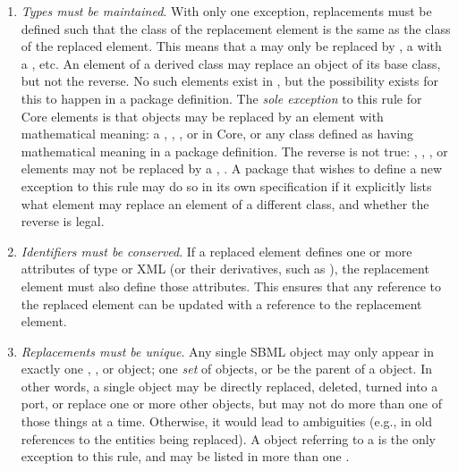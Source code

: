 \begin{enumerate}

\item \emph{Types must be maintained}.  With only one exception, replacements must be defined such that the class of the replacement element is the same as the class of the replaced element.  This means that a \Species may only be replaced by \Species, a \Reaction with a \Reaction, etc.  An element of a derived class may replace an object of its base class, but not the reverse.  No such elements exist in \sbmlthreecore, but the possibility exists for this to happen in a package definition.  The \emph{sole exception} to this rule for Core elements is that \Parameter {} objects may be replaced by an element with mathematical meaning: a \Compartment, \Reaction, \Species, or \SpeciesReference in Core, or any class defined as having mathematical meaning in a package definition.    The reverse is not true: \Compartment, \Reaction, \Species, or \SpeciesReference elements may not be replaced by a \Parameter, .  A package that wishes to define a new exception to this rule may do so in its own specification if it explicitly lists what element may replace an element of a different class, and whether the reverse is legal.

\item \emph{Identifiers must be conserved}.  If a replaced element defines one or more attributes of type  or XML  (or their derivatives, such as ), the replacement element must also define those attributes.  This ensures that any reference to the replaced element can be updated with a reference to the replacement element.

\item \emph{Replacements must be unique}.  Any single SBML object may only appear in exactly one \ReplacedElement,  \Port, or \Deletion object; one \emph{set} of \ReplacedBy objects, or be the parent of a \ReplacedBy object.  In other words, a single object may be directly replaced, deleted, turned into a port, or replace one or more other objects, but may not do more than one of those things at a time.  Otherwise, it would lead to ambiguities (e.g., in old references to the entities being replaced). A \ReplacedElement object referring to a \Deletion is the only exception to this rule,  and may be listed in more than one \ListOfReplacedElements.


\end{enumerate}
